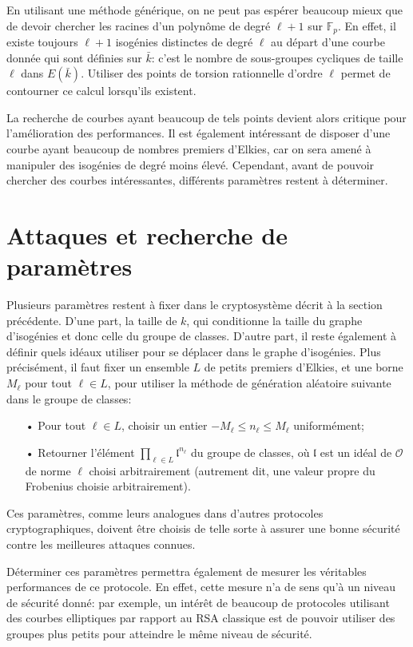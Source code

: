 \documentclass[11pt,a4paper]{article}
\newcommand{\F}{\mathbb{F}}
\renewcommand{\O}{\mathcal{O}}
\renewcommand{\frak}{\mathfrak}
\theoremstyle{definition}
\begin{document}
En utilisant une méthode générique, on ne peut pas espérer beaucoup mieux que de devoir chercher les racines d'un polynôme de degré $\ell + 1$ sur $\F_p$. En effet, il existe toujours $\ell + 1$ isogénies distinctes de degré $\ell$ au départ d'une courbe donnée qui sont définies sur $\bar{k}$: c'est le nombre de sous-groupes cycliques de taille $\ell$ dans $E(\bar{k})$. Utiliser des points de torsion rationnelle d'ordre $\ell$ permet de contourner ce calcul lorsqu'ils existent.

La recherche de courbes ayant beaucoup de tels points devient alors critique pour l'amélioration des performances. Il est également intéressant de disposer d'une courbe ayant beaucoup de nombres premiers d'Elkies, car on sera amené à manipuler des isogénies de degré moins élevé. Cependant, avant de pouvoir chercher des courbes intéressantes, différents paramètres restent à déterminer.



\newpage
\section{Attaques et recherche de paramètres}

Plusieurs paramètres restent à fixer dans le cryptosystème décrit à la section précédente. D'une part, la taille de $k$, qui conditionne la taille du graphe d'isogénies et donc celle du groupe de classes. D'autre part, il reste également à définir quels idéaux utiliser pour se déplacer dans le graphe d'isogénies. Plus précisément, il faut fixer un ensemble $L$ de petits premiers d'Elkies, et une borne $M_\ell$ pour tout $\ell\in L$, pour utiliser la méthode de génération aléatoire suivante dans le groupe de classes:
\begin{itemize}
\item[•] Pour tout $\ell\in L$, choisir un entier $- M_\ell\leq n_\ell\leq M_\ell$ uniformément;
\item[•] Retourner l'élément $\prod_{\ell\in L} {\frak l}^{n_\ell}$ du groupe de classes, où $\frak l$ est un idéal de $\O$ de norme $\ell$ choisi arbitrairement (autrement dit, une valeur propre du Frobenius choisie arbitrairement).
\end{itemize}

Ces paramètres, comme leurs analogues dans d'autres protocoles cryptographiques, doivent être choisis de telle sorte à assurer une bonne sécurité contre les meilleures attaques connues. 

Déterminer ces paramètres permettra également de mesurer les véritables performances de ce protocole. En effet, cette mesure n'a de sens qu'à un niveau de sécurité donné: par exemple, un intérêt de beaucoup de protocoles utilisant des courbes elliptiques par rapport au RSA classique est de pouvoir utiliser des groupes plus petits pour atteindre le même niveau de sécurité.
\end{document}
